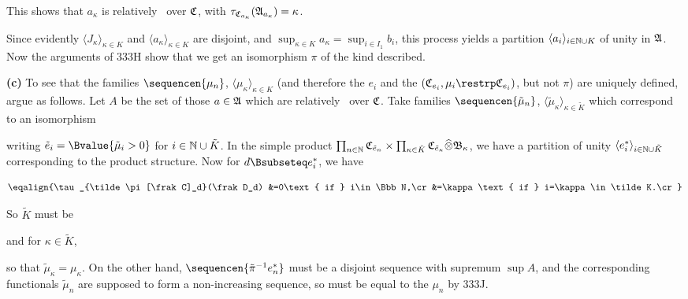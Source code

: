 {\noindent This shows that $a_{\kappa}$ is relatively \Mth\
over $\frak C$, with
$\tau_{\frak C_{a_{\kappa}}}(\frak A_{a_{\kappa}})=\kappa$.\ \Qed

Since evidently $\langle J_{\kappa}\rangle_{\kappa\in K}$ and
$\langle a_{\kappa}\rangle_{\kappa\in K}$ are disjoint, and
$\sup_{\kappa\in K}a_{\kappa}=\sup_{i\in I_1}b_i$,
this process yields a partition
$\langle a_i\rangle_{i\in\Bbb N\cup K}$ of unity in $\frak A$.
Now the arguments of 333H show that we get an isomorphism $\pi$ of the
kind described.

\medskip

{\bf (c)} To see that the families $\sequencen{\mu_n}$,
$\langle\mu_{\kappa}\rangle_{\kappa\in K}$ (and therefore the $e_i$ and
the $(\frak C_{e_i},\mu_i\restrp\frak C_{e_i})$, but not $\pi$) are
uniquely defined, argue as follows.   Let $A$ be the set of
those $a\in\frak A$ which are relatively \Mth\ over $\frak C$.
Take  families
$\sequencen{\tilde\mu_n}$,
$\langle\tilde\mu_{\kappa}\rangle_{\kappa\in\tilde K}$
which correspond to an isomorphism


\noindent writing $\tilde e_i=\Bvalue{\tilde\mu_i>0}$ for
$i\in\Bbb N\cup\tilde K$.   In the simple product
$\prod_{n\in\Bbb N}\frak C_{\tilde e_n}
  \times\prod_{\kappa\in \tilde K}
  \frak C_{\tilde e_{\kappa}}\widehat{\otimes}\frak B_{\kappa}$,
we have a partition of unity
$\langle e_i^*\rangle_{i\in\Bbb N\cup\tilde K}$ corresponding to the
product structure.   Now for $d\Bsubseteq e_i^*$, we have

$$\eqalign{\tau_{\tilde\pi[\frak C]_d}(\frak D_d)
&=0\text{ if } i\in\Bbb N,\cr
&=\kappa\text{ if } i=\kappa\in\tilde K.\cr}$$

\noindent So $\tilde K$ must be


\noindent and for $\kappa\in\tilde K$,


\noindent so that $\tilde\mu_{\kappa}=\mu_{\kappa}$.   On the other hand,
$\sequencen{\tilde\pi^{-1}e_n^*}$ must be a disjoint sequence with
supremum $\sup A$, and the corresponding functionals $\tilde\mu_n$ are
supposed to form a non-increasing sequence, so must be equal to the
$\mu_n$ by 333J.
}%

